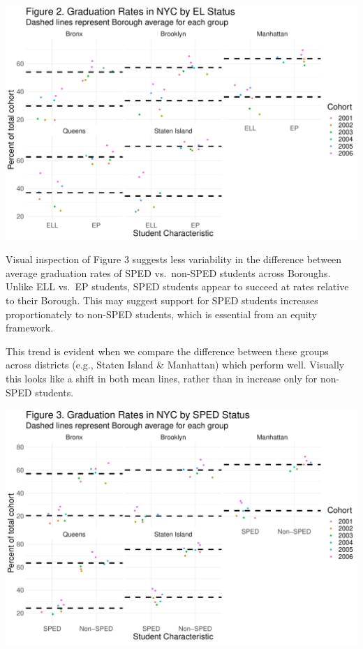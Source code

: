 \documentclass[
  english,
  man, fleqn, noextraspace]{apa6}
\begin{document}
\includegraphics{EDLD_651_Final_Project_Draft_files/figure-latex/graph_results_EL_graph-1.pdf}

Visual inspection of Figure 3 suggests less variability in the difference between average graduation rates of SPED vs.~non-SPED students across Boroughs. Unlike ELL vs.~EP students, SPED students appear to succeed at rates relative to their Borough. This may suggest support for SPED students increases proportionately to non-SPED students, which is essential from an equity framework.

This trend is evident when we compare the difference between these groups across districts (e.g., Staten Island \& Manhattan) which perform well. Visually this looks like a shift in both mean lines, rather than in increase only for non-SPED students.

\includegraphics{EDLD_651_Final_Project_Draft_files/figure-latex/graph_results_SPED-1.pdf}
\end{document}
